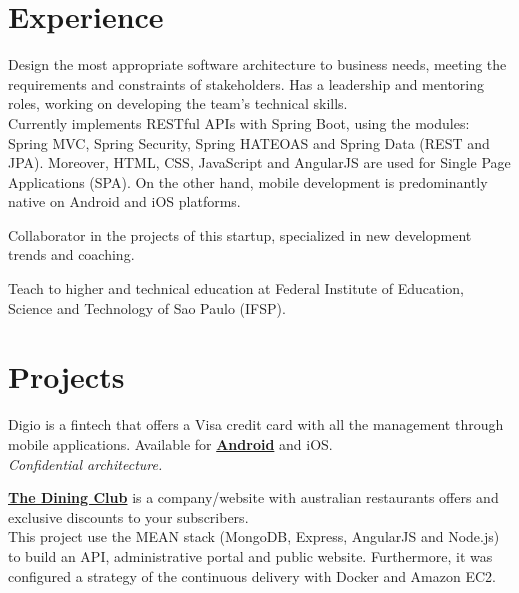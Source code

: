 \documentclass[]{resume}
\begin{document}
\hfill
\begin{minipage}[t]{0.66\textwidth} 


\section{Experience}
Design the most appropriate software architecture to business needs, meeting the requirements and constraints of stakeholders. Has a leadership and mentoring roles, working on developing the team's technical skills.\\
Currently implements RESTful APIs with Spring Boot, using the modules: Spring MVC, Spring Security, Spring HATEOAS and Spring Data (REST and JPA). Moreover, HTML, CSS, JavaScript and AngularJS are used for Single Page Applications (SPA). On the other hand, mobile development is predominantly native on Android and iOS platforms.
\sectionsep

Collaborator in the projects of this startup, specialized in new development trends and coaching.
\sectionsep

Teach to higher and technical education at Federal Institute of Education, Science and Technology of Sao Paulo (IFSP).
\sectionsep


\section{Projects}

Digio is a fintech that offers a Visa credit card with all the management through mobile applications. Available for \textbf{\href{https://goo.gl/zvebsh}{Android}} and iOS.\\
\textit{Confidential architecture.}
\sectionsep

\textbf{\href{https://www.thediningclub.com.au}{The Dining Club}} is a company/website with australian restaurants offers and exclusive discounts to your subscribers.\\
This project use the MEAN stack (MongoDB, Express, AngularJS and Node.js) to build an API, administrative portal and public website. Furthermore, it was configured a strategy of the continuous delivery with Docker and Amazon EC2.
\sectionsep


\end{minipage}
\end{document}
